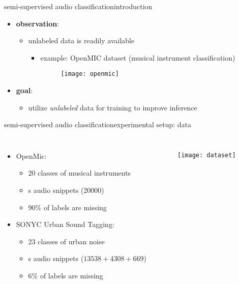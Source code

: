 \begin{frame}{semi-supervised audio classification}{introduction}
\begin{itemize}
    \item   \textbf{observation}:
        \begin{itemize}
            \item unlabeled data is readily available 
                \begin{itemize}
                    \item example: OpenMIC dataset (musical instrument classification)
                        \begin{figure}%
                            \texttt{[image: openmic]}%
                        \end{figure}
                \end{itemize}
        \end{itemize}
    \bigskip
    \item<2->  \textbf{goal}: 
        \begin{itemize}
            \item utilize \textit{unlabeled} data for training to improve inference
        \end{itemize}
\end{itemize}
\end{frame}

\begin{frame}{semi-supervised audio classification}{experimental setup: data}
    \begin{columns}
            \begin{itemize}
                \item   OpenMic:
                    \begin{itemize}
                        \item   20 classes of musical instruments
                        \item   \unit[10]{s} audio snippets (20000)
                        \item   90\% of labels are missing
                    \end{itemize}
                \bigskip
                \item   SONYC Urban Sound Tagging:
                    \begin{itemize}
                        \item   23 classes of urban noise
                        \item   \unit[10]{s} audio snippets ($13538+4308+669$)
                        \item   6\% of labels are missing
                    \end{itemize}
            \end{itemize}
            \begin{figure}%
                \texttt{[image: dataset]}%
            \end{figure}
    \end{columns}
\end{frame}

